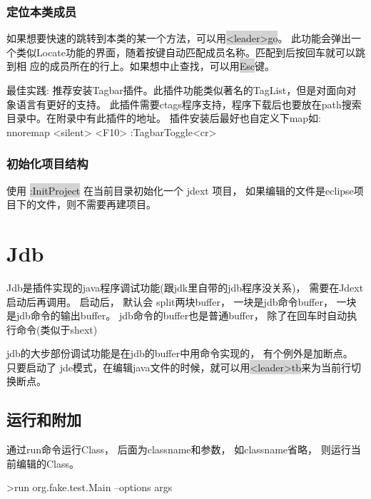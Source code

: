 \documentclass[oneside,openany]{book}
\begin{document}
\subsubsection{定位本类成员}
  如果想要快速的跳转到本类的某一个方法，可以用\colorbox{lightgray}{<leader>go}。
  此功能会弹出一个类似Locate功能的界面，随着按键自动匹配成员名称。匹配到后按回车就可以跳到相
  应的成员所在的行上。如果想中止查找，可以用\colorbox{lightgray}{Esc}键。
  \begin{mdframed}[style=BestPracticeFrame]
    最佳实践: 推荐安装Tagbar插件。此插件功能类似著名的TagList，但是对面向对象语言有更好的支持。
    此插件需要ctags程序支持，程序下载后也要放在path搜索目录中。在附录中有此插件的地址。
    插件安装后最好也自定义下map如:
      nnoremap <silent> <F10> :TagbarToggle<cr>
  \end{mdframed}

\subsubsection{初始化项目结构}
使用 \colorbox{lightgray}{:InitProject} 在当前目录初始化一个 jdext 项目， 如果编辑的文件是eclipse项目下的文件，则不需要再建项目。 

\section{Jdb}
    Jdb是插件实现的java程序调试功能(跟jdk里自带的jdb程序没关系)， 需要在Jdext启动后再调用。 启动后， 默认会 
    split两块buffer， 一块是jdb命令buffer， 一块是jdb命令的输出buffer。 jdb命令的buffer也是普通buffer， 除了在回车时自动执行命令(类似于shext) 

    jdb的大步部份调试功能是在jdb的buffer中用命令实现的， 有个例外是加断点。 只要启动了
    jde模式，在编辑java文件的时候，就可以用\colorbox{lightgray}{<leader>tb}来为当前行切换断点。

  \subsection{运行和附加}
    
    通过run命令运行Class， 后面为classname和参数， 如classname省略， 则运行当前编辑的Class。
    \begin{mdframed}[style=SmallFrame]
    \begin{flushleft}
    >run org.fake.test.Main --options args
    \end{flushleft}
    \end{mdframed}
    \vspace{4mm}
\end{document}
